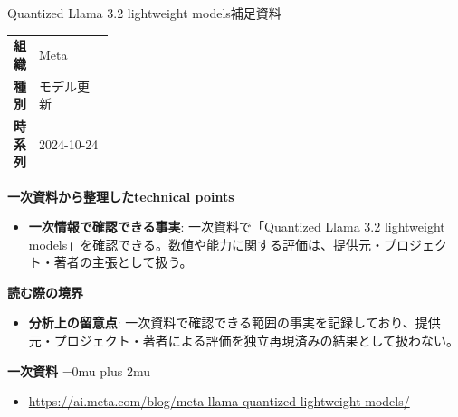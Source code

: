 \begin{technicalnote}{Quantized Llama 3.2 lightweight models}{補足資料}
\begingroup
\begin{tabularx}{\linewidth}{@{}>{\bfseries}p{0.22\linewidth}X@{}}
組織 & Meta \\
種別 & モデル更新 \\
時系列 & 2024-10-24 \\
\end{tabularx}
\smallskip
{\bfseries 一次資料から整理したtechnical points}
\begin{itemize}[leftmargin=1.5em,itemsep=0.35em]
\item \textbf{一次情報で確認できる事実}: 一次資料で「Quantized Llama 3.2 lightweight models」を確認できる。数値や能力に関する評価は、提供元・プロジェクト・著者の主張として扱う。
\end{itemize}
\begin{minipage}{\linewidth}
{\bfseries 読む際の境界}
\begin{itemize}[leftmargin=1.5em,itemsep=0.35em]
\item \textbf{分析上の留意点}: 一次資料で確認できる範囲の事実を記録しており、提供元・プロジェクト・著者による評価を独立再現済みの結果として扱わない。
\end{itemize}
\begin{samepage}
{\bfseries 一次資料}
\begingroup\sloppy
\Urlmuskip=0mu plus 2mu\relax
\begin{itemize}[leftmargin=1.5em,itemsep=0.25em]
\item {\scriptsize\url{https://ai.meta.com/blog/meta-llama-quantized-lightweight-models/}}
\end{itemize}
\endgroup
\end{samepage}
\end{minipage}
\endgroup
\end{technicalnote}
\medskip
